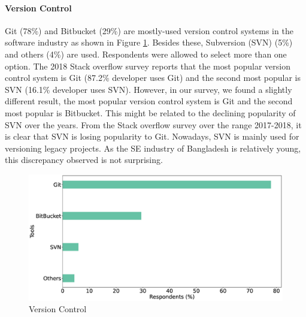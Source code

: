 \paragraph{Version Control}
Git (78\%) and Bitbucket (29\%) are mostly-used version control systems in the software industry as shown in Figure \ref{fig:versionControl}. Besides these, Subversion (SVN) (5\%) and others (4\%) are used.  Respondents were allowed to select more than one option. The 2018 Stack overflow survey\cite{StackoverflowSurvey2018} reports that the most popular version control system is Git (87.2\% developer uses Git) and the second most popular is SVN (16.1\% developer uses SVN). However, in our survey, we found a slightly different result, the most popular version control system is Git and the second most popular is Bitbucket. This might be related to the declining popularity of SVN over the years. From the Stack overflow survey over the range 2017-2018, it is clear that SVN is losing popularity to Git. Nowadays, SVN is mainly used for versioning legacy projects. As the SE industry of Bangladesh is relatively young, this discrepancy observed is not surprising.
  
\begin{figure}[h]
\centering
  \includegraphics[scale=0.16]{Figures/Respondents_version_control}
  \caption{Version Control}
  \label{fig:versionControl}
\end{figure}
